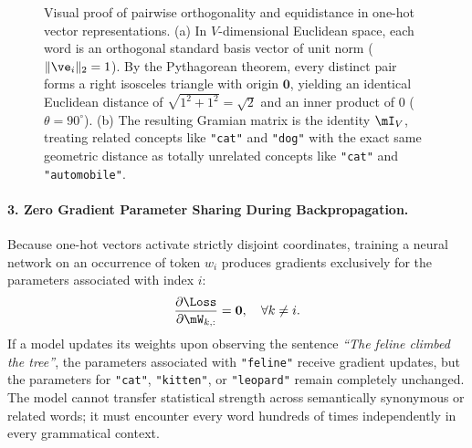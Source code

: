 \documentclass[../../main.tex]{subfiles}
\begin{document}
\begin{figure}[htbp]
\caption{Visual proof of pairwise orthogonality and equidistance in one-hot vector representations. (a) In $V$-dimensional Euclidean space, each word is an orthogonal standard basis vector of unit norm ($\|\ve_i\|_2 = 1$). By the Pythagorean theorem, every distinct pair forms a right isosceles triangle with origin $\mathbf{0}$, yielding an identical Euclidean distance of $\sqrt{1^2 + 1^2} = \sqrt{2}$ and an inner product of $0$ ($\theta = 90^\circ$). (b) The resulting Gramian matrix is the identity $\mI_V$, treating related concepts like \texttt{"cat"} and \texttt{"dog"} with the exact same geometric distance as totally unrelated concepts like \texttt{"cat"} and \texttt{"automobile"}.}
\label{fig:onehot_orthogonality_geometry}
\end{figure}

\paragraph{3. Zero Gradient Parameter Sharing During Backpropagation.}
Because one-hot vectors activate strictly disjoint coordinates, training a neural network on an occurrence of token $w_i$ produces gradients exclusively for the parameters associated with index $i$:
\begin{equation}
\label{eq:weight_update_isolation}
\frac{\partial \Loss}{\partial \mW_{k, :}} = \mathbf{0}, \quad \forall k \neq i.
\end{equation}
If a model updates its weights upon observing the sentence \emph{``The feline climbed the tree''}, the parameters associated with \texttt{"feline"} receive gradient updates, but the parameters for \texttt{"cat"}, \texttt{"kitten"}, or \texttt{"leopard"} remain completely unchanged. The model cannot transfer statistical strength across semantically synonymous or related words; it must encounter every word hundreds of times independently in every grammatical context.
\end{document}
